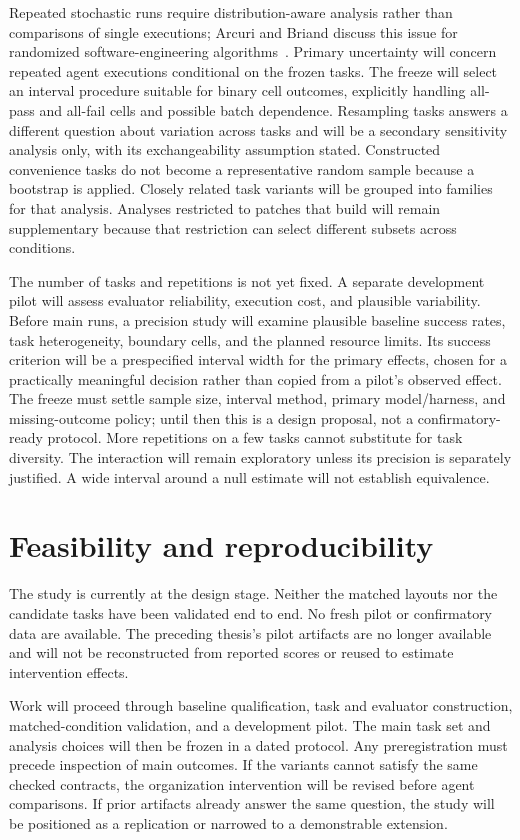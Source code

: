 \documentclass[11pt,a4paper]{article}
\begin{document}
Repeated stochastic runs require distribution-aware analysis rather than comparisons of single executions; Arcuri and Briand discuss this issue for randomized software-engineering algorithms~\cite{arcuri2014statistics}. Primary uncertainty will concern repeated agent executions conditional on the frozen tasks. The freeze will select an interval procedure suitable for binary cell outcomes, explicitly handling all-pass and all-fail cells and possible batch dependence. Resampling tasks answers a different question about variation across tasks and will be a secondary sensitivity analysis only, with its exchangeability assumption stated. Constructed convenience tasks do not become a representative random sample because a bootstrap is applied. Closely related task variants will be grouped into families for that analysis. Analyses restricted to patches that build will remain supplementary because that restriction can select different subsets across conditions.

The number of tasks and repetitions is not yet fixed. A separate development pilot will assess evaluator reliability, execution cost, and plausible variability. Before main runs, a precision study will examine plausible baseline success rates, task heterogeneity, boundary cells, and the planned resource limits. Its success criterion will be a prespecified interval width for the primary effects, chosen for a practically meaningful decision rather than copied from a pilot's observed effect. The freeze must settle sample size, interval method, primary model/harness, and missing-outcome policy; until then this is a design proposal, not a confirmatory-ready protocol. More repetitions on a few tasks cannot substitute for task diversity. The interaction will remain exploratory unless its precision is separately justified. A wide interval around a null estimate will not establish equivalence.

\section{Feasibility and reproducibility}
The study is currently at the design stage. Neither the matched layouts nor the candidate tasks have been validated end to end. No fresh pilot or confirmatory data are available. The preceding thesis's pilot artifacts are no longer available and will not be reconstructed from reported scores or reused to estimate intervention effects.

Work will proceed through baseline qualification, task and evaluator construction, matched-condition validation, and a development pilot. The main task set and analysis choices will then be frozen in a dated protocol. Any preregistration must precede inspection of main outcomes. If the variants cannot satisfy the same checked contracts, the organization intervention will be revised before agent comparisons. If prior artifacts already answer the same question, the study will be positioned as a replication or narrowed to a demonstrable extension.
\end{document}
